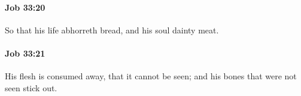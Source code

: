 		\paragraph{Job 33:20} %
			\label{JOB-33-20}

			So that his life abhorreth bread, and his soul dainty meat.


		\paragraph{Job 33:21} %
			\label{JOB-33-21}

			His flesh is consumed away, that it cannot be seen; and his bones that were not seen stick out.



